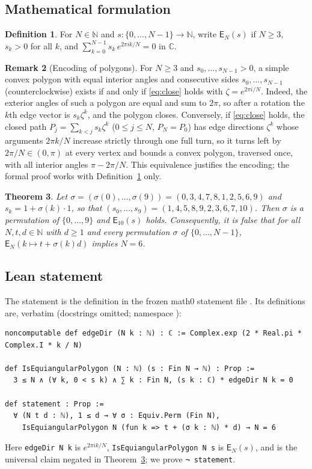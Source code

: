 \documentclass[11pt]{amsart}
\theoremstyle{plain}
\newtheorem{theorem}{Theorem}
\theoremstyle{definition}
\newtheorem{definition}[theorem]{Definition}
\newtheorem{remark}[theorem]{Remark}
\newcommand{\N}{\mathbb{N}}
\newcommand{\C}{\mathbb{C}}
\newcommand{\Eq}{\mathsf{E}}
\begin{document}
\subsection*{Mathematical formulation}
\begin{definition}\label{def:E}
For $N\in\N$ and $s\colon\{0,\dots,N-1\}\to\N$, write $\Eq_N(s)$ if $N\ge3$, $s_k>0$ for all $k$, and $\sum_{k=0}^{N-1}s_k\,e^{2\pi ik/N}=0$ in $\C$.
\end{definition}

\begin{remark}[Encoding of polygons]\label{rem:encoding}
For $N\ge3$ and $s_0,\dots,s_{N-1}>0$, a simple convex polygon with equal interior angles and consecutive sides $s_0,\dots,s_{N-1}$ (counterclockwise) exists if and only if \eqref{eq:close} holds with $\zeta=e^{2\pi i/N}$.
Indeed, the exterior angles of such a polygon are equal and sum to $2\pi$, so after a rotation the $k$th edge vector is $s_k\zeta^k$, and the polygon closes.
Conversely, if \eqref{eq:close} holds, the closed path $P_j=\sum_{k<j}s_k\zeta^k$ ($0\le j\le N$, $P_N=P_0$) has edge directions $\zeta^k$ whose arguments $2\pi k/N$ increase strictly through one full turn, so it turns left by $2\pi/N\in(0,\pi)$ at every vertex and bounds a convex polygon, traversed once, with all interior angles $\pi-2\pi/N$.
This equivalence justifies the encoding; the formal proof works with Definition~\ref{def:E} only.
\end{remark}

\begin{theorem}\label{thm:main}
Let $\sigma=(\sigma(0),\dots,\sigma(9))=(0,3,4,7,8,1,2,5,6,9)$ and $s_k=1+\sigma(k)\cdot1$, so that $(s_0,\dots,s_9)=(1,4,5,8,9,2,3,6,7,10)$.
Then $\sigma$ is a permutation of $\{0,\dots,9\}$ and $\Eq_{10}(s)$ holds.
Consequently, it is false that for all $N,t,d\in\N$ with $d\ge1$ and every permutation $\sigma$ of $\{0,\dots,N-1\}$, $\Eq_N(k\mapsto t+\sigma(k)d)$ implies $N=6$.
\end{theorem}

\subsection*{Lean statement}
The statement is the definition  in the frozen math0 statement file .
Its definitions are, verbatim (docstrings omitted; namespace ):
\begin{lstlisting}
noncomputable def edgeDir (N k : ℕ) : ℂ := Complex.exp (2 * Real.pi * Complex.I * k / N)

def IsEquiangularPolygon (N : ℕ) (s : Fin N → ℕ) : Prop :=
  3 ≤ N ∧ (∀ k, 0 < s k) ∧ ∑ k : Fin N, (s k : ℂ) * edgeDir N k = 0

def statement : Prop :=
  ∀ (N t d : ℕ), 1 ≤ d → ∀ σ : Equiv.Perm (Fin N),
    IsEquiangularPolygon N (fun k => t + (σ k : ℕ) * d) → N = 6
\end{lstlisting}
Here \texttt{edgeDir N k} is $e^{2\pi ik/N}$, \texttt{IsEquiangularPolygon N s} is $\Eq_N(s)$, and  is the universal claim negated in Theorem~\ref{thm:main}; we prove \texttt{¬ statement}.
\end{document}
